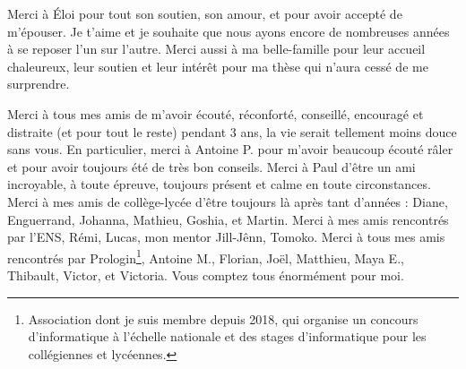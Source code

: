 Merci à Éloi pour tout son soutien, son amour, et pour avoir accepté de m’épouser. Je t’aime et je souhaite que nous ayons encore de nombreuses années à se reposer l’un sur l’autre. Merci aussi à ma belle-famille pour leur accueil chaleureux, leur soutien et leur intérêt pour ma thèse qui n’aura cessé de me surprendre.


Merci à tous mes amis de m’avoir écouté, réconforté, conseillé, encouragé et distraite (et pour tout le reste) pendant 3 ans, la vie serait tellement moins douce sans vous.
En particulier, merci à Antoine P. pour m’avoir beaucoup écouté râler et pour avoir toujours été de très bon conseils. Merci à Paul d’être un ami incroyable, à toute épreuve, toujours présent et calme en toute circonstances. Merci à mes amis de collège-lycée d’être toujours là après tant d’années : Diane, Enguerrand, Johanna, Mathieu, Goshia, et Martin. Merci à mes amis rencontrés par l’ENS, Rémi, Lucas, mon mentor Jill-Jênn, Tomoko. Merci à tous mes amis rencontrés par Prologin\footnote{Association dont je suis membre depuis 2018, qui organise un concours d’informatique à l’échelle nationale et des stages d’informatique pour les collégiennes et lycéennes.}, Antoine M., Florian, Joël, Matthieu, Maya E., Thibault, Victor, et Victoria. Vous comptez tous énormément pour moi.
